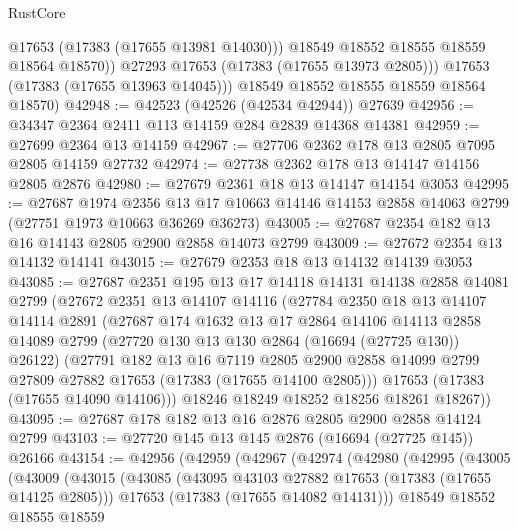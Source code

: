 \begin{lexlean}{RustCore}
\begin{coremodule}
                @17653
                (@17383 (@17655 @13981 @14030)))
              @18549
              @18552
              @18555
              @18559
              @18564
              @18570))
          @27293
          @17653
          (@17383 (@17655 @13973 @2805)))
        @17653
        (@17383 (@17655 @13963 @14045)))
      @18549
      @18552
      @18555
      @18559
      @18564
      @18570)
@42948 := @42523 (@42526 (@42534 @42944)) @27639
@42956 := @34347 @2364 @2411 @113 @14159 @284 @2839 @14368 @14381
@42959 := @27699 @2364 @13 @14159
@42967 := @27706 @2362 @178 @13 @2805 @7095 @2805 @14159 @27732
@42974 := @27738 @2362 @178 @13 @14147 @14156 @2805 @2876
@42980 := @27679 @2361 @18 @13 @14147 @14154 @3053
@42995 := @27687
    @1974
    @2356
    @13
    @17
    @10663
    @14146
    @14153
    @2858
    @14063
    @2799
    (@27751 @1973 @10663 @36269 @36273)
@43005 := @27687 @2354 @182 @13 @16 @14143 @2805 @2900 @2858 @14073 @2799
@43009 := @27672 @2354 @13 @14132 @14141
@43015 := @27679 @2353 @18 @13 @14132 @14139 @3053
@43085 := @27687
    @2351
    @195
    @13
    @17
    @14118
    @14131
    @14138
    @2858
    @14081
    @2799
    (@27672
      @2351
      @13
      @14107
      @14116
      (@27784
        @2350
        @18
        @13
        @14107
        @14114
        @2891
        (@27687
          @174
          @1632
          @13
          @17
          @2864
          @14106
          @14113
          @2858
          @14089
          @2799
          (@27720 @130 @13 @130 @2864 (@16694 (@27725 @130)) @26122)
          (@27791
            @182
            @13
            @16
            @7119
            @2805
            @2900
            @2858
            @14099
            @2799
            @27809
            @27882
            @17653
            (@17383 (@17655 @14100 @2805)))
          @17653
          (@17383 (@17655 @14090 @14106)))
        @18246
        @18249
        @18252
        @18256
        @18261
        @18267))
@43095 := @27687 @178 @182 @13 @16 @2876 @2805 @2900 @2858 @14124 @2799
@43103 := @27720 @145 @13 @145 @2876 (@16694 (@27725 @145)) @26166
@43154 := @42956
    (@42959
      (@42967
        (@42974
          (@42980
            (@42995
              (@43005
                (@43009
                  (@43015
                    (@43085
                      (@43095 @43103 @27882 @17653 (@17383 (@17655 @14125 @2805)))
                      @17653
                      (@17383 (@17655 @14082 @14131)))
                    @18549
                    @18552
                    @18555
                    @18559

\end{coremodule}
\end{lexlean}
